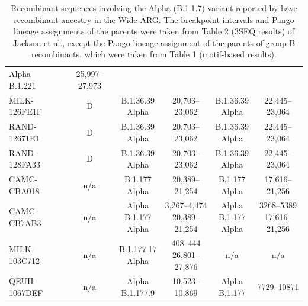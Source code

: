 \documentclass{article}
\begin{document}
\begin{table}
\begin{tabular}{l|c|c|c|c|c}
    \thead{Alpha \\ B.1.221} & 25,997–27,973 \\
MILK-126FE1F & D & \thead{B.1.36.39 \\ Alpha} & 20,703–23,062 &
    \thead{B.1.36.39 \\ Alpha} & 22,445–23,064 \\
RAND-12671E1 & D & \thead{B.1.36.39 \\ Alpha} & 20,703–23,062 &
    \thead{B.1.36.39 \\ Alpha} & 22,445–23,064 \\
RAND-128FA33 & D & \thead{B.1.36.39 \\ Alpha} & 20,703–23,062 &
    \thead{B.1.36.39 \\ Alpha} & 22,445–23,064 \\
CAMC-CBA018 & n/a & \thead{B.1.177 \\ Alpha} & 20,389–21,254 &
    \thead{B.1.177 \\ Alpha} & 17,616--21,256 \\
CAMC-CB7AB3 & n/a & \thead{Alpha \\ B.1.177 \\ Alpha} & \thead{3,267–4,474 \\ 20,389–21,254} &
     \thead{Alpha \\ B.1.177 \\ Alpha} & \thead{3268--5389\\17,616--21,256} \\
MILK-103C712 & n/a & \thead{B.1.177.17 \\ Alpha} & \thead{408–444 \\ 26,801–27,876} &
    n/a & n/a \\
QEUH-1067DEF & n/a & \thead{Alpha \\ B.1.177.9} & 10,523–10,869 &
    \thead{Alpha \\ B.1.177} & 7729--10871 \\ \hline
\end{tabular}
\caption{\label{tab:jackson_supplement}Recombinant sequences involving the Alpha (B.1.1.7) variant reported by \cite{Jackson2021-ik} have recombinant ancestry in the Wide ARG. The breakpoint intervals and Pango lineage assignments of the parents were taken from Table 2 (3SEQ results) of Jackson et al., except the Pango lineage assignment of the parents of group B recombinants, which were taken from Table 1 (motif-based results).}
\end{table}
\end{document}
